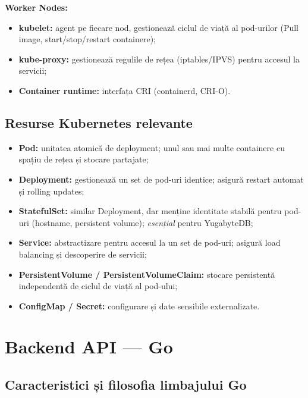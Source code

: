 \textbf{Worker Nodes:}
\begin{itemize}
    \item \textbf{kubelet:} agent pe fiecare nod, gestionează ciclul de
    viață al pod-urilor (Pull image, start/stop/restart containere);
    \item \textbf{kube-proxy:} gestionează regulile de rețea (iptables/IPVS)
    pentru accesul la servicii;
    \item \textbf{Container runtime:} interfața CRI (containerd, CRI-O).
\end{itemize}

\subsection{Resurse Kubernetes relevante}
\label{subsec:k8s_resurse}

\begin{itemize}
    \item \textbf{Pod:} unitatea atomică de deployment; unul sau mai multe
    containere cu spațiu de rețea și stocare partajate;
    \item \textbf{Deployment:} gestionează un set de pod-uri identice;
    asigură restart automat și rolling updates;
    \item \textbf{StatefulSet:} similar Deployment, dar menține identitate
    stabilă pentru pod-uri (hostname, persistent volume); \emph{esențial}
    pentru YugabyteDB;
    \item \textbf{Service:} abstractizare pentru accesul la un set de pod-uri;
    asigură load balancing și descoperire de servicii;
    \item \textbf{PersistentVolume / PersistentVolumeClaim:} stocare persistentă
    independentă de ciclul de viață al pod-ului;
    \item \textbf{ConfigMap / Secret:} configurare și date sensibile externalizate.
\end{itemize}

\section{Backend API — Go}
\label{sec:golang}

\subsection{Caracteristici și filosofia limbajului Go}
\label{subsec:go_caracteristici}

